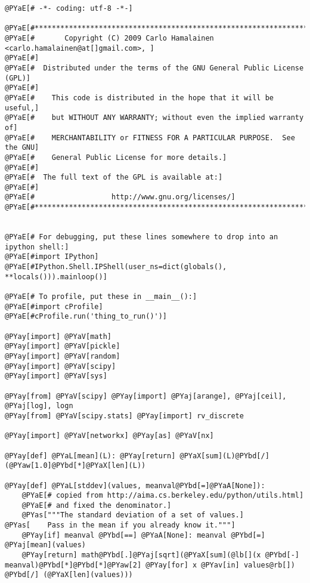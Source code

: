 \begin{Verbatim}[commandchars=@\[\]]
@PYaE[# -*- coding: utf-8 -*-]

@PYaE[#*****************************************************************************]
@PYaE[#       Copyright (C) 2009 Carlo Hamalainen <carlo.hamalainen@at[]gmail.com>, ]
@PYaE[#]
@PYaE[#  Distributed under the terms of the GNU General Public License (GPL)]
@PYaE[#]
@PYaE[#    This code is distributed in the hope that it will be useful,]
@PYaE[#    but WITHOUT ANY WARRANTY; without even the implied warranty of]
@PYaE[#    MERCHANTABILITY or FITNESS FOR A PARTICULAR PURPOSE.  See the GNU]
@PYaE[#    General Public License for more details.]
@PYaE[#]
@PYaE[#  The full text of the GPL is available at:]
@PYaE[#]
@PYaE[#                  http://www.gnu.org/licenses/]
@PYaE[#*****************************************************************************]


@PYaE[# For debugging, put these lines somewhere to drop into an ipython shell:]
@PYaE[#import IPython]
@PYaE[#IPython.Shell.IPShell(user_ns=dict(globals(), **locals())).mainloop()]

@PYaE[# To profile, put these in __main__():]
@PYaE[#import cProfile]
@PYaE[#cProfile.run('thing_to_run()')]

@PYay[import] @PYaV[math]
@PYay[import] @PYaV[pickle]
@PYay[import] @PYaV[random]
@PYay[import] @PYaV[scipy]
@PYay[import] @PYaV[sys]

@PYay[from] @PYaV[scipy] @PYay[import] @PYaj[arange], @PYaj[ceil], @PYaj[log], logn
@PYay[from] @PYaV[scipy.stats] @PYay[import] rv_discrete

@PYay[import] @PYaV[networkx] @PYay[as] @PYaV[nx]

@PYay[def] @PYaL[mean](L): @PYay[return] @PYaX[sum](L)@PYbd[/](@PYaw[1.0]@PYbd[*]@PYaX[len](L))

@PYay[def] @PYaL[stddev](values, meanval@PYbd[=]@PYaA[None]):
    @PYaE[# copied from http://aima.cs.berkeley.edu/python/utils.html]
    @PYaE[# and fixed the denominator.]
    @PYas["""The standard deviation of a set of values.]
@PYas[    Pass in the mean if you already know it."""]
    @PYay[if] meanval @PYbd[==] @PYaA[None]: meanval @PYbd[=] @PYaj[mean](values)
    @PYay[return] math@PYbd[.]@PYaj[sqrt](@PYaX[sum](@lb[](x @PYbd[-] meanval)@PYbd[*]@PYbd[*]@PYaw[2] @PYay[for] x @PYav[in] values@rb[]) @PYbd[/] (@PYaX[len](values)))


\end{Verbatim}
